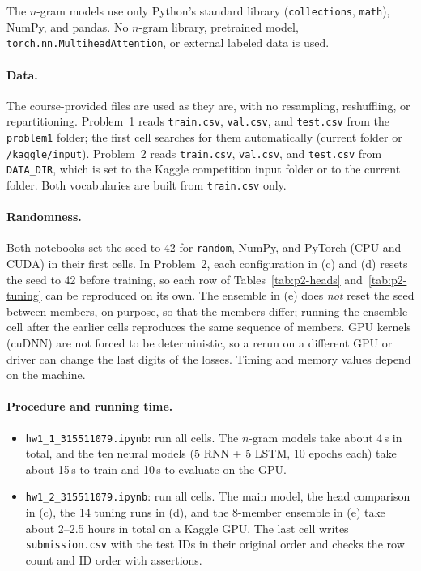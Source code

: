\documentclass[11pt,a4paper]{article}
\begin{document}
The $n$-gram models use only Python's standard library (\texttt{collections},
\texttt{math}), NumPy, and pandas. No $n$-gram library, pretrained model,
\texttt{torch.nn.MultiheadAttention}, or external labeled data is used.

\paragraph{Data.}
The course-provided files are used as they are, with no resampling,
reshuffling, or repartitioning. Problem~1 reads \texttt{train.csv},
\texttt{val.csv}, and \texttt{test.csv} from the \texttt{problem1}
folder; the first cell searches for them automatically (current folder
or \texttt{/kaggle/input}). Problem~2 reads \texttt{train.csv},
\texttt{val.csv}, and \texttt{test.csv} from \texttt{DATA\_DIR}, which
is set to the Kaggle competition input folder or to the current folder.
Both vocabularies are built from \texttt{train.csv} only.

\paragraph{Randomness.}
Both notebooks set the seed to 42 for \texttt{random}, NumPy, and
PyTorch (CPU and CUDA) in their first cells. In Problem~2, each
configuration in (c) and (d) resets the seed to 42 before training, so
each row of Tables~\ref{tab:p2-heads} and~\ref{tab:p2-tuning} can be
reproduced on its own. The ensemble in (e) does \emph{not} reset the
seed between members, on purpose, so that the members differ; running
the ensemble cell after the earlier cells reproduces the same sequence
of members. GPU kernels (cuDNN) are not forced to be deterministic, so
a rerun on a different GPU or driver can change the last digits of the
losses. Timing and memory values depend on the machine.

\paragraph{Procedure and running time.}
\begin{itemize}
    \item \texttt{hw1\_1\_315511079.ipynb}: run all cells. The $n$-gram
          models take about 4\,s in total, and the ten neural models
          (5 RNN + 5 LSTM, 10 epochs each) take about 15\,s to train and
          10\,s to evaluate on the GPU.
    \item \texttt{hw1\_2\_315511079.ipynb}: run all cells. The main
          model, the head comparison in (c), the 14 tuning runs in (d),
          and the 8-member ensemble in (e) take about 2--2.5 hours in
          total on a Kaggle GPU. The last cell writes
          \texttt{submission.csv} with the test IDs in their original
          order and checks the row count and ID order with assertions.
\end{itemize}
\end{document}
